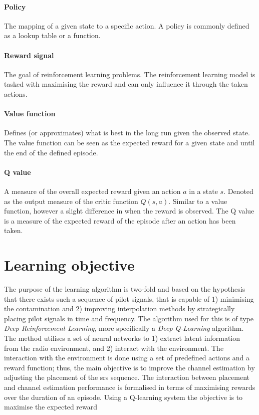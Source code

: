\paragraph{Policy}
The mapping of a given state to a specific action. A policy is commonly defined as a lookup table or a function. 

\paragraph{Reward signal}
The goal of reinforcement learning problems. The reinforcement learning model is tasked with maximising the reward and can only influence it through the taken actions.

\paragraph{Value function}
Defines (or approximates) what is best in the long run given the observed state. The value function can be seen as the expected reward for a given state and until the end of the defined episode. 

\paragraph{Q value}
A measure of the overall expected reward given an action $a$ in a state $s$. Denoted as the output measure of the critic function $Q(s, a)$. Similar to a value function, however a slight difference in when the reward is observed. The Q value is a measure of the expected reward of the episode after an action has been taken.


\section{Learning objective}
The purpose of the learning algorithm is two-fold and based on the hypothesis that there exists such a sequence of pilot signals, that is capable of 1) minimising the contamination and 2) improving interpolation methods by strategically placing pilot signals in time and frequency. The algorithm used for this is of type \emph{Deep Reinforcement Learning}, more specifically a \emph{Deep Q-Learning} algorithm. The method utilises a set of neural networks to 1) extract latent information from the radio environment, and 2) interact with the environment. The interaction with the environment is done using a set of predefined actions and a reward function; thus, the main objective is to improve the channel estimation by adjusting the placement of the \gls{srs} sequence. The interaction between placement and channel estimation performance is formalised in terms of maximising rewards over the duration of an episode. Using a Q-learning system the objective is to maximise the expected reward

